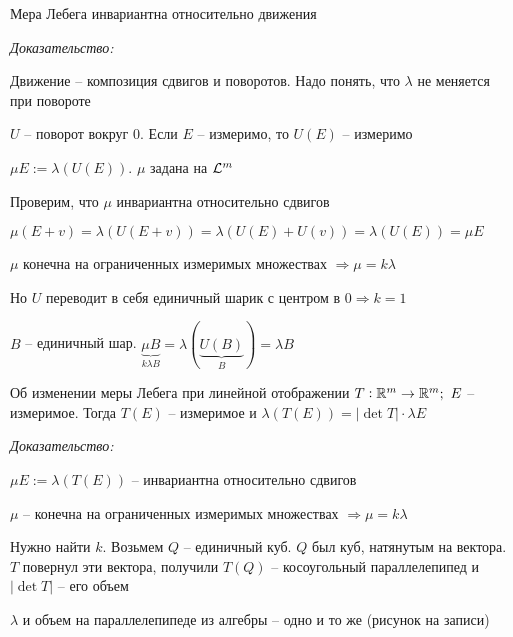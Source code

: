 \documentclass[12pt]{article}
\begin{document}
\begin{theo}{}
    Мера Лебега инвариантна относительно движения
\end{theo}

\textit{Доказательство:}

Движение -- композиция сдвигов и поворотов. Надо понять, что $\lambda$ не меняется при повороте

$U$ -- поворот вокруг 0. Если $E$ -- измеримо, то $U(E)$ -- измеримо 

$\mu E := \lambda(U(E))$. $\mu$ задана на $\mathcal{L}^m$

Проверим, что $\mu$ инвариантна относительно сдвигов

$\mu(E + v) = \lambda(U(E + v)) = \lambda(U(E) + U(v)) = \lambda(U(E)) = \mu E$

$\mu$ конечна на ограниченных измеримых множествах $\Rightarrow \mu = k \lambda$

Но $U$ переводит в себя единичный шарик с центром в $0 \Rightarrow k = 1$

$B$ -- единичный шар. $\underbrace{\mu B}_{k \lambda B} = \lambda(\underbrace{U(B)}_{B}) = \lambda B$

\begin{theo}{Об изменении меры Лебега при линейной отображении}
    $T : \mathbb R^m \to \mathbb R^m;\ E$ -- измеримое. Тогда $T(E)$ -- измеримое и $\lambda(T(E)) = |\det T| \cdot \lambda E$
\end{theo}

\textit{Доказательство:}

$\mu E := \lambda(T(E))$ -- инвариантна относительно сдвигов

$\mu$ -- конечна на ограниченных измеримых множествах $\Rightarrow \mu = k \lambda$

Нужно найти $k$. Возьмем $Q$ -- единичный куб. $Q$ был куб, натянутым на вектора. $T$ повернул эти вектора, получили $T(Q)$ -- косоугольный параллелепипед и $|\det T|$ -- его объем

\begin{Remark}{}
    $\lambda$ и объем на параллелепипеде из алгебры -- одно и то же (рисунок на записи)
\end{Remark}
\end{document}
